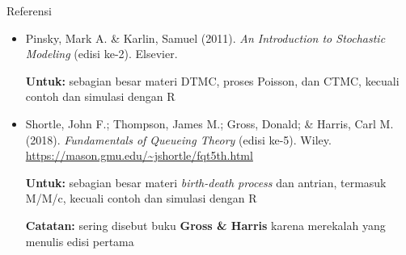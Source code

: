 \documentclass{beamer}
\begin{document}
\begin{frame}{Referensi}
    \begin{itemize}
        \item Pinsky, Mark A. \& Karlin, Samuel (2011). \textit{An Introduction to Stochastic Modeling} (edisi ke-2). Elsevier.
        
        \textbf{Untuk:} sebagian besar materi DTMC, proses Poisson, dan CTMC, kecuali contoh dan simulasi dengan R

        \item Shortle, John F.; Thompson, James M.; Gross, Donald; \& Harris, Carl M. (2018). \textit{Fundamentals of Queueing Theory} (edisi ke-5). Wiley. \url{https://mason.gmu.edu/~jshortle/fqt5th.html}
        
        \textbf{Untuk:} sebagian besar materi \textit{birth-death process} dan antrian, termasuk M/M/c, kecuali contoh dan simulasi dengan R

        \textbf{Catatan:} sering disebut buku \textbf{Gross \& Harris} karena merekalah yang menulis edisi pertama
    \end{itemize}
\end{frame}
\end{document}
